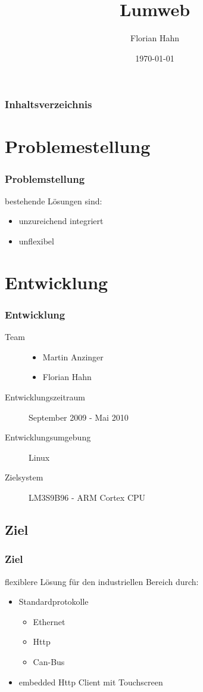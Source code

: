 \documentclass{beamer}
\begin{document}
\title{Lumweb}  
\author{Florian Hahn}
\date{\today} 

\begin{frame}
\titlepage
\end{frame}

\begin{frame}\frametitle{Inhaltsverzeichnis}\tableofcontents
\end{frame} 


\section{Problemestellung} 
\begin{frame}\frametitle{Problemstellung}
  bestehende Lösungen sind:\\
  \begin{itemize}
    \item unzureichend integriert
    \item unflexibel
  \end{itemize}
\end{frame}



\section{Entwicklung} 
\begin{frame}\frametitle{Entwicklung}
  \begin{description}
    \item [Team]
      \begin{itemize}
        \item Martin Anzinger
        \item Florian Hahn
      \end{itemize}
    \item[Entwicklungszeitraum] September 2009 - Mai 2010
    \item[Entwicklungsumgebung] Linux
    \item[Zielsystem] LM3S9B96 - ARM Cortex CPU 
  \end{description}
\end{frame}

\subsection{Ziel}
\begin{frame}\frametitle{Ziel}
  flexiblere Lösung für den industriellen Bereich durch:
  \begin{itemize}
    \item Standardprotokolle
       \begin{itemize}
         \item Ethernet
         \item Http
         \item Can-Bus
       \end{itemize}
    \item embedded Http Client mit Touchscreen
  \end{itemize}
\end{frame}
\end{document}
